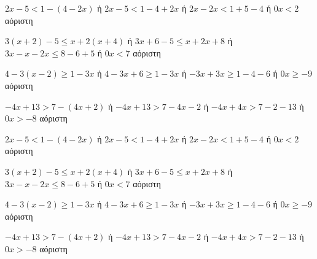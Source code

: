 \begin{alist}
\item $ 2x-5<1-(4-2x) $ ή $ 2x-5<1-4+2x $ ή $ 2x-2x<1+5-4 $ ή $ 0x<2 $ αόριστη
\item $ 3(x+2)-5\leq x+2(x+4) $ ή $ 3x+6-5\leq x+2x+8 $ ή $ 3x-x-2x\leq 8-6+5 $ ή $ 0x<7 $ αόριστη
\item $ 4-3(x-2)\geq 1-3x $ ή $ 4-3x+6\geq 1-3x $ ή $ -3x+3x\geq 1-4-6 $ ή $ 0x\geq -9 $ αόριστη
\item $ -4x+13>7-(4x+2) $ ή $ -4x+13>7-4x-2 $ ή $ -4x+4x>7-2-13 $ ή $ 0x>-8 $ αόριστη
\end{alist}
\begin{alist}
\item $ 2x-5<1-(4-2x) $ ή $ 2x-5<1-4+2x $ ή $ 2x-2x<1+5-4 $ ή $ 0x<2 $ αόριστη
\item $ 3(x+2)-5\leq x+2(x+4) $ ή $ 3x+6-5\leq x+2x+8 $ ή $ 3x-x-2x\leq 8-6+5 $ ή $ 0x<7 $ αόριστη
\item $ 4-3(x-2)\geq 1-3x $ ή $ 4-3x+6\geq 1-3x $ ή $ -3x+3x\geq 1-4-6 $ ή $ 0x\geq -9 $ αόριστη
\item $ -4x+13>7-(4x+2) $ ή $ -4x+13>7-4x-2 $ ή $ -4x+4x>7-2-13 $ ή $ 0x>-8 $ αόριστη
\end{alist}
